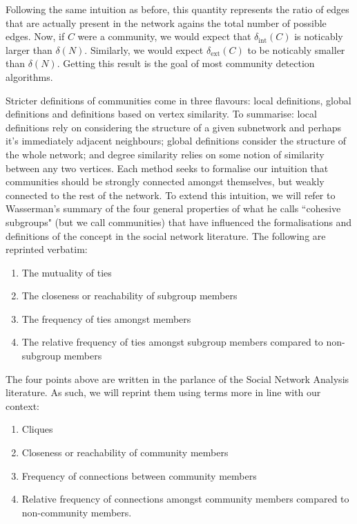 Following the same intuition as before, this quantity represents the ratio of edges that are actually present in the network agains the total number of possible edges. Now, if $C$ were a community, we would expect that $\delta_{\text{int}}(C)$ is noticably larger than $\delta(N)$. Similarly, we would expect $\delta_{\text{ext}}(C)$ to be noticably smaller than $\delta(N)$. Getting this result is the goal of most community detection algorithms.

Stricter definitions of communities come in three flavours: local definitions, global definitions and definitions based on vertex similarity. To summarise: local definitions rely on considering the structure of a given subnetwork and perhaps it's immediately adjacent neighbours; global definitions consider the structure of the whole network; and degree similarity relies on some notion of similarity between any two vertices. Each method seeks to formalise our intuition that communities should be strongly connected amongst themselves, but weakly connected to the rest of the network. To extend this intuition, we will refer to Wasserman's summary of the four general properties of what he calls ``cohesive subgroups" (but we call communities) that have influenced the formalisations and definitions of the concept in the social network literature.\cite[251-252]{wasserman_faust_1994} The following are reprinted verbatim:

\begin{enumerate}
    \item The mutuality of ties
    \item The closeness or reachability of subgroup members
    \item The frequency of ties amongst members
    \item The relative frequency of ties amongst subgroup members compared to non-subgroup members
\end{enumerate}

The four points above are written in the parlance of the Social Network Analysis literature. As such, we will reprint them using terms more in line with our context:

\begin{enumerate}
    \item Cliques
    \item Closeness or reachability of community members
    \item Frequency of connections between community members
    \item Relative frequency of connections amongst community members compared to non-community members.
\end{enumerate}

